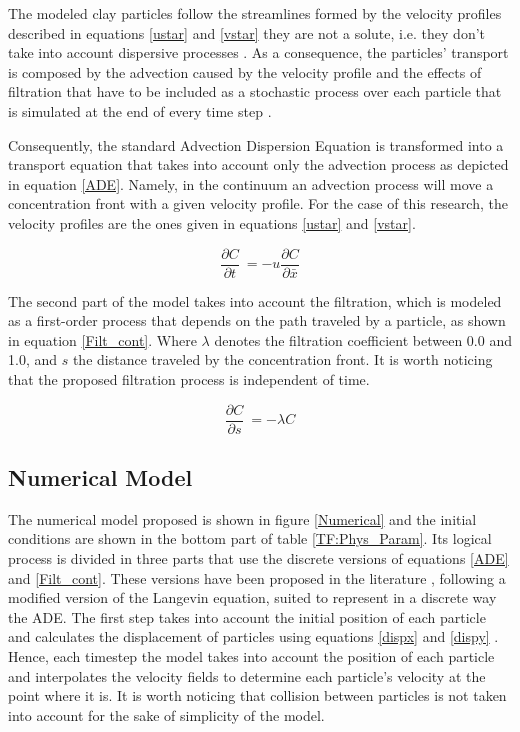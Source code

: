 \documentclass[draft,linenumbers]{agujournal2018}
\begin{document}
The modeled clay particles follow the streamlines formed by the velocity profiles described in equations \ref{ustar} and \ref{vstar} they are not a solute, i.e. they don't take into account dispersive processes \citep{Domenico1998}. As a consequence, the particles' transport is composed by the advection caused by the velocity profile and the effects of filtration that have to be included as a stochastic process over each particle that is simulated at the end of every time step \citep{Prickett1981}. 

Consequently, the standard Advection Dispersion Equation is transformed into a transport equation that takes into account only the advection process as depicted in equation \ref{ADE}. Namely, in the continuum an advection process will move a concentration front with a given velocity profile. For the case of this research, the velocity profiles are the ones given in equations \ref{ustar} and \ref{vstar}.

\begin{equation}
 \label{ADE}
 	\frac{\partial C}{\partial t} \ = -u \frac{\partial C}{\partial \bar{x}}
 \end{equation}

The second part of the model takes into account the filtration, which is modeled as a first-order process that depends on the path traveled by a particle, as shown in equation \ref{Filt_cont}. Where $\lambda$ denotes the filtration coefficient between 0.0 and 1.0, and $s$ the distance traveled by the concentration front. It is worth noticing that the proposed filtration process is independent of time. 

 \begin{equation}
 \label{Filt_cont}
 	\frac{\partial C}{\partial s} \ = -\lambda C
 \end{equation}

\subsection{Numerical Model} \label{Numerical_model}

The numerical model proposed is shown in figure \ref{Numerical} and the initial conditions are shown in the bottom part of table \ref{TF:Phys_Param}. Its logical process is divided in three parts that use the discrete versions of equations \ref{ADE} and \ref{Filt_cont}. These versions have been proposed in the literature \citep{Delay2005,Dentz2011}, following a modified version of the Langevin equation, suited to represent in a discrete way the ADE. The first step takes into account the initial position of each particle and calculates the displacement of particles using equations \ref{dispx} and \ref{dispy} \citep{Li2017}. Hence, each timestep the model takes into account the position of each particle and interpolates the velocity fields to determine each particle's velocity at the point where it is. It is worth noticing that collision between particles is not taken into account for the sake of simplicity of the model. 
\end{document}
